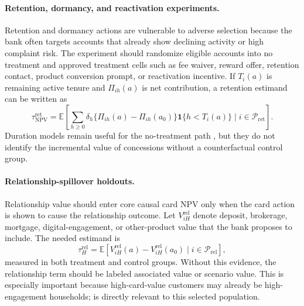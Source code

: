 \documentclass[11pt]{article}
\newcommand{\E}{\mathbb{E}}
\newcommand{\NPV}{\mathrm{NPV}}
\newcommand{\1}{\mathbf{1}}
\begin{document}
\paragraph{Retention, dormancy, and reactivation experiments.}
Retention and dormancy actions are vulnerable to adverse selection because the
bank often targets accounts that already show declining activity or high
complaint risk. The experiment should randomize eligible accounts into no
treatment and approved treatment cells such as fee waiver, reward offer,
retention contact, product conversion prompt, or reactivation incentive. If
$T_i(a)$ is remaining active tenure and $\Pi_{ih}(a)$ is net contribution, a
retention estimand can be written as
\begin{equation}
  \tau^{\mathrm{ret}}_{\NPV}
  =
  \E\!\left[
    \sum_{h\ge 0}\delta_h
    \{\Pi_{ih}(a)-\Pi_{ih}(a_0)\}\1\{h<T_i(a)\}
    \mid i\in\mathcal{P}_{\mathrm{ret}}
  \right].
  \label{eq:retention-npv-estimand}
\end{equation}
Duration models remain useful for the no-treatment path
\citep{schmittlein1987counting,fader2005bgnbd,bolton1998duration}, but they
do not identify the incremental value of concessions without a counterfactual
control group.

\paragraph{Relationship-spillover holdouts.}
Relationship value should enter core causal card NPV only when the card action
is shown to cause the relationship outcome. Let $V^{\mathrm{rel}}_{iH}$ denote
deposit, brokerage, mortgage, digital-engagement, or other-product value that
the bank proposes to include. The needed estimand is
\begin{equation}
  \tau^{\mathrm{rel}}_{H}
  =
  \E[V^{\mathrm{rel}}_{iH}(a)-V^{\mathrm{rel}}_{iH}(a_0)
  \mid i\in\mathcal{P}_{\mathrm{rel}}],
  \label{eq:relationship-spillover}
\end{equation}
measured in both treatment and control groups. Without this evidence, the
relationship term should be labeled associated value or scenario value. This
is especially important because high-card-value customers may already be
high-engagement households; \citet{heckman1979selection} is directly relevant
to this selected population.
\end{document}
